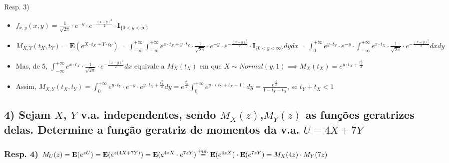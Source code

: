 \documentclass[english]{article}
\begin{document}
Resp. 3)
\begin{itemize}
\item $f_{x,y}(x,y)=\frac{1}{\sqrt{2\pi}}\cdot e^{-y}\cdot e^{-\frac{(x-y)^{2}}{2}}\cdot\mathbf{I}_{\{0<y<\infty\}}$
\item $M_{X,Y}(t_{X},t_{Y})=\mathbf{E}(e^{X\cdot t_{X}+Y\cdot t_{Y}})=\int_{-\infty}^{+\infty}\int_{-\infty}^{+\infty}e^{x\cdot t_{X}+y\cdot t_{Y}}\cdot\frac{1}{\sqrt{2\pi}}\cdot e^{-y}\cdot e^{-\frac{(x-y)^{2}}{2}}\cdot\mathbf{I}_{\{0<y<\infty\}}dydx=\int_{0}^{+\infty}e^{y\cdot t_{Y}}\cdot e^{-y}\cdot\int_{-\infty}^{+\infty}e^{x\cdot t_{X}}\cdot\frac{1}{\sqrt{2\pi}}\cdot e^{-\frac{(x-y)^{2}}{2}}dxdy$
\item Mas, de 5, $\int_{-\infty}^{+\infty}e^{x\cdot t_{X}}\cdot\frac{1}{\sqrt{2\pi}}\cdot e^{-\frac{(x-y)^{2}}{2}}dx$
equivale a $M_{X}(t_{X})$ em que $X\sim Normal(y,1)\implies M_{X}(t_{X})=e^{y\cdot t_{X}+\frac{t_{X}^{2}}{2}}$
\item Assim, $M_{X,Y}(t_{X},t_{Y})=\int_{0}^{+\infty}e^{y\cdot t_{Y}}\cdot e^{-y}\cdot e^{y\cdot t_{X}+\frac{t_{X}^{2}}{2}}dy=e^{\frac{t_{X}^{2}}{2}}\int_{0}^{+\infty}e^{y\cdot(t_{Y}+t_{X}-1)}dy=\frac{e^{\frac{t_{X}^{2}}{2}}}{1-t_{Y}-t_{X}}$,
se $t_{Y}+t_{X}<1$
\end{itemize}

\subsection*{\textcompwordmark{}}


\subsection*{\textmd{4) Sejam $X$, $Y$ v.a. independentes, sendo $M_{X}(z)$,$M_{Y}(z)$
as funções geratrizes delas. Determine a função geratriz de momentos
da v.a. $U=4X+7Y$}}


\subsubsection*{\textmd{Resp. 4) }$M_{U}(z)=\mathbf{E}(e^{zU})=\mathbf{E}(e^{z(4X+7Y)})=\mathbf{E}(e^{4zX}\cdot e^{7zY})\protect\overset{ind.}{=}\mathbf{E}(e^{4zX})\cdot\mathbf{E}(e^{7zY})=M_{X}(4z)\cdot M_{Y}(7z)$}


\subsection*{\textcompwordmark{}}
\end{document}
